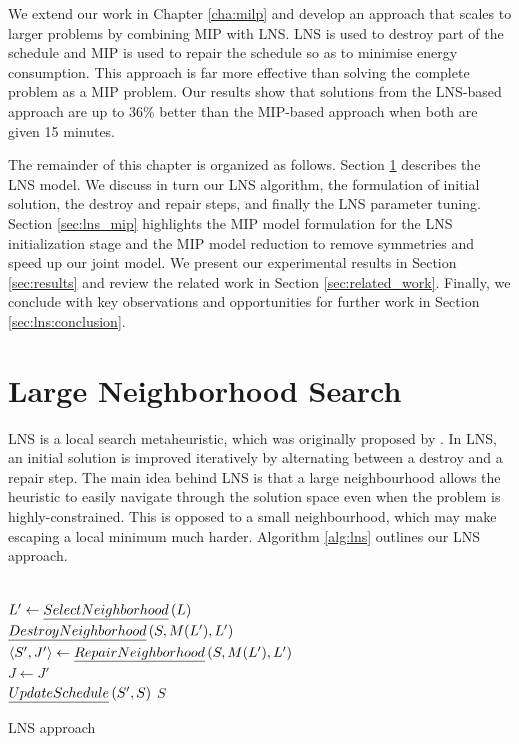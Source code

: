 We extend our work in Chapter \ref{cha:milp} and develop an approach that scales to larger problems by combining MIP with LNS. LNS is used to destroy part of the schedule and MIP is used to repair the schedule so as to minimise energy consumption. This approach is far more effective than solving the complete problem as a MIP problem. Our results show that solutions from the LNS-based approach are up to 36\% better than the MIP-based approach when both are given 15 minutes. 

The remainder of this chapter is organized as follows. 
Section \ref{sec:lns} describes the LNS model. We discuss in turn our LNS algorithm, the formulation of initial solution, the destroy and repair steps, and finally the LNS parameter tuning. 
Section \ref{sec:lns_mip} highlights the MIP model formulation for the LNS initialization stage and the MIP model reduction to remove symmetries and speed up our joint model. 
We present our experimental results in Section \ref{sec:results} and review the related work in Section \ref{sec:related_work}.
Finally, we conclude with key observations and opportunities for further work in Section \ref{sec:lns:conclusion}.

\section{Large Neighborhood Search}\label{sec:lns}

LNS is a local search metaheuristic, which was originally proposed by \cite{shaw1998using}. In LNS, an initial solution is improved iteratively by alternating between a destroy and a repair step. The main idea behind LNS is that a large neighbourhood allows the heuristic to easily navigate through the solution space even when the problem is highly-constrained. This is opposed to a small neighbourhood, which may make escaping a local minimum much harder. Algorithm \ref{alg:lns} outlines our LNS approach. 

\begin{algorithm}[ht!]
\small
{}
 \Indm
 \Initialize{}
 \\
 \Indm
 \Algorithm{}
 \Indp
 {
	$L' \gets \emph{SelectNeighborhood}\left(L\right)$ \\
	$\emph{DestroyNeighborhood}\left(S, M(L'), L' \right)$ \\
	$\langle S', J' \rangle \gets \emph{RepairNeighborhood}\left(S, M(L'), L' \right)$\\
	{
		$J \gets J' $\\
		$\emph{UpdateSchedule}\left(S', S \right)$
	}
 }
 \Return $S$
 \caption{LNS approach}
 \label{alg:lns}
\end{algorithm}

